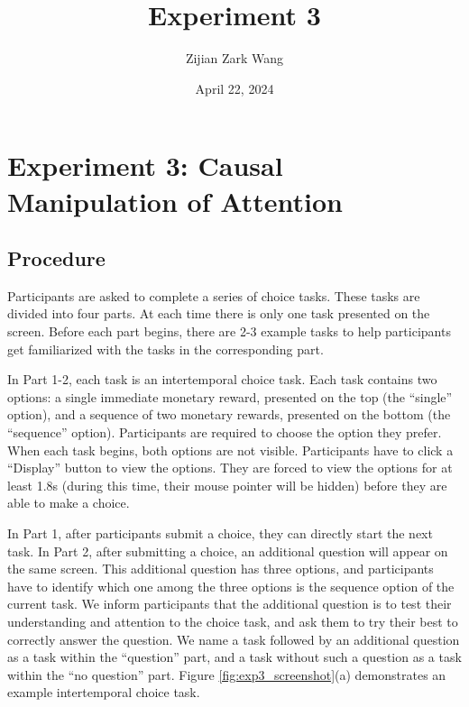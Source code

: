 \documentclass[
  12pt,
]{article}
\title{Experiment 3}
\author{Zijian Zark Wang}
\date{April 22, 2024}
\begin{document}
\maketitle

\hypertarget{experiment-3-causal-manipulation-of-attention}{%
\section{Experiment 3: Causal Manipulation of
Attention}\label{experiment-3-causal-manipulation-of-attention}}

\hypertarget{procedure}{%
\subsection{Procedure}\label{procedure}}

Participants are asked to complete a series of choice tasks. These tasks
are divided into four parts. At each time there is only one task
presented on the screen. Before each part begins, there are 2-3 example
tasks to help participants get familiarized with the tasks in the
corresponding part.

In Part 1-2, each task is an intertemporal choice task. Each task
contains two options: a single immediate monetary reward, presented on
the top (the ``single'' option), and a sequence of two monetary rewards,
presented on the bottom (the ``sequence'' option). Participants are
required to choose the option they prefer. When each task begins, both
options are not visible. Participants have to click a ``Display'' button
to view the options. They are forced to view the options for at least
1.8s (during this time, their mouse pointer will be hidden) before they
are able to make a choice.

In Part 1, after participants submit a choice, they can directly start
the next task. In Part 2, after submitting a choice, an additional
question will appear on the same screen. This additional question has
three options, and participants have to identify which one among the
three options is the sequence option of the current task. We inform
participants that the additional question is to test their understanding
and attention to the choice task, and ask them to try their best to
correctly answer the question. We name a task followed by an additional
question as a task within the ``question'' part, and a task without such
a question as a task within the ``no question'' part. Figure
\ref{fig:exp3_screenshot}(a) demonstrates an example intertemporal
choice task.
\end{document}
